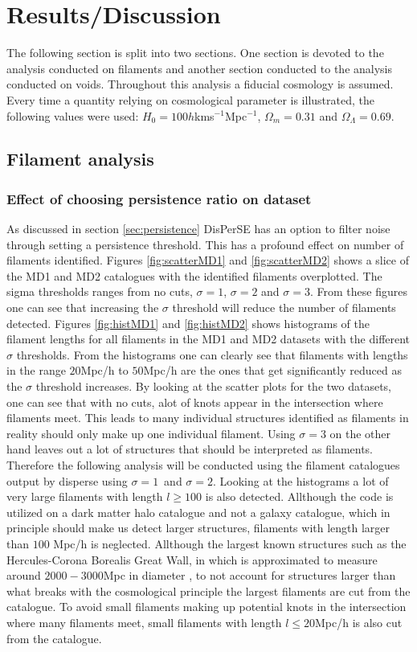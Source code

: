\chapter{Results/Discussion}
The following section is split into two sections. One section is devoted to the analysis conducted on filaments and another section conducted to the analysis conducted on voids. Throughout this analysis a fiducial cosmology is assumed. Every time a quantity relying on cosmological parameter is illustrated, the following values were used: $H_0=100h$kms$^{-1}$Mpc$^{-1}$, $\Omega_m=0.31$ and $\Omega_\Lambda=0.69$.
\section{Filament analysis}

\subsection{Effect of choosing persistence ratio on dataset}
As discussed in section \ref{sec:persistence} DisPerSE has an option to filter
noise through setting a persistence threshold. This has a profound effect on number of filaments identified. Figures \ref{fig:scatterMD1} and \ref{fig:scatterMD2} shows a slice of the MD1 and MD2 catalogues with the identified filaments overplotted. The sigma thresholds ranges from no cuts, $\sigma=1$, $\sigma=2$ and $\sigma=3$. From these figures one can see that increasing the $\sigma$ threshold will reduce the number of filaments detected. Figures \ref{fig:histMD1} and \ref{fig:histMD2} shows histograms of the filament lengths for all filaments in the MD1 and MD2 datasets with the different $\sigma$ thresholds. From the histograms one can clearly see that filaments with lengths in the range $20$Mpc/h to $50$Mpc/h are the ones that get significantly reduced as the $\sigma$ threshold increases. By looking at the scatter plots for the two datasets, one can see that with no cuts, alot of knots appear in the intersection where filaments meet. This leads to many individual structures identified as filaments in reality should only make up one individual filament. Using $\sigma=3$ on the other hand leaves out a lot of structures that should be interpreted as filaments. Therefore the following analysis will be conducted using the filament catalogues output by disperse using $\sigma=1$ and $\sigma=2$. Looking at the histograms a lot of very large filaments with length $l\geq 100$ is also detected. Allthough the code is utilized on a dark matter halo catalogue and not a galaxy catalogue, which in principle should make us detect larger structures, filaments with length larger than $100$ Mpc/h is neglected. Allthough the largest known structures such as the Hercules-Corona Borealis Great Wall, in which is approximated to measure around $2000-3000$Mpc in diameter \cite{herculescorona}, to not account for structures larger than what breaks with the cosmological principle the largest filaments are cut from the catalogue. To avoid small filaments making up potential knots in the intersection where many filaments meet, small filaments with length $l\leq 20$Mpc/h is also cut from the catalogue.
